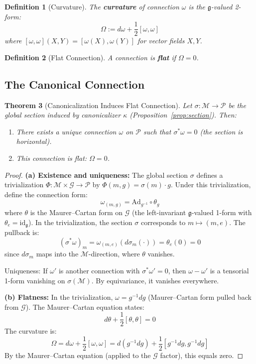 \documentclass[11pt]{article}
\newtheorem{theorem}{Theorem}[section]
\newtheorem{definition}[theorem]{Definition}
\begin{document}
\begin{definition}[Curvature]
The \textbf{curvature} of connection $\omega$ is the $\mathfrak{g}$-valued 2-form:
\[
\Omega := d\omega + \frac{1}{2}[\omega, \omega]
\]
where $[\omega, \omega](X, Y) = [\omega(X), \omega(Y)]$ for vector fields $X, Y$.
\end{definition}

\begin{definition}[Flat Connection]
A connection is \textbf{flat} if $\Omega = 0$.
\end{definition}

\subsection{The Canonical Connection}

\begin{theorem}[Canonicalization Induces Flat Connection]
\label{thm:flat}
Let $\sigma : \mathcal{M} \to \mathcal{P}$ be the global section
induced by canonicalizer $\kappa$ (Proposition~\ref{prop:section}). Then:
\begin{enumerate}
    \item[(a)] There exists a unique connection $\omega$ on $\mathcal{P}$ such that $\sigma^* \omega = 0$ (the section is horizontal).
    \item[(b)] This connection is flat: $\Omega = 0$.
\end{enumerate}
\end{theorem}

\begin{proof}
\textbf{(a) Existence and uniqueness:}
The global section $\sigma$ defines a trivialization $\Phi : \mathcal{M} \times \mathcal{G} \to \mathcal{P}$ by $\Phi(m, g) = \sigma(m) \cdot g$.
Under this trivialization, define the connection form:
\[
\omega_{(m,g)} = \mathrm{Ad}_{g^{-1}} \circ \theta_g
\]
where $\theta$ is the Maurer--Cartan form on $\mathcal{G}$ (the left-invariant $\mathfrak{g}$-valued 1-form with $\theta_e = \mathrm{id}_{\mathfrak{g}}$).
In the trivialization, the section $\sigma$ corresponds to $m \mapsto (m, e)$. The pullback is:
\[
(\sigma^* \omega)_m = \omega_{(m,e)}(d\sigma_m(\cdot)) = \theta_e(0) = 0
\]
since $d\sigma_m$ maps into the $\mathcal{M}$-direction, where $\theta$ vanishes.

Uniqueness: If $\omega'$ is another connection with $\sigma^* \omega' = 0$, then $\omega - \omega'$ is a tensorial 1-form
vanishing on $\sigma(\mathcal{M})$. By equivariance, it vanishes everywhere.

\textbf{(b) Flatness:}
In the trivialization, $\omega = g^{-1} dg$ (Maurer--Cartan form pulled back from $\mathcal{G}$). The Maurer--Cartan equation states:
\[
d\theta + \frac{1}{2}[\theta, \theta] = 0
\]
The curvature is:
\[
\Omega = d\omega + \frac{1}{2}[\omega, \omega] = d(g^{-1} dg) + \frac{1}{2}[g^{-1} dg, g^{-1} dg]
\]
By the Maurer--Cartan equation (applied to the $\mathcal{G}$ factor), this equals zero.
\end{proof}
\end{document}
